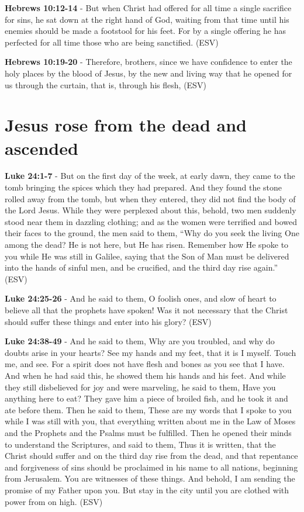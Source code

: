 \documentclass[11pt]{article}
\begin{document}
\textbf{Hebrews 10:12-14} - But when Christ had offered for all time a single sacrifice for sins, he sat down at the right hand of God, waiting from that time until his enemies should be made a footstool for his feet. For by a single offering he has perfected for all time those who are being sanctified. (ESV)

\textbf{Hebrews 10:19-20} - Therefore, brothers, since we have confidence to enter the holy places by the blood of Jesus, by the new and living way that he opened for us through the curtain, that is, through his flesh, (ESV)

\section{Jesus rose from the dead and ascended}
\label{sec:orgf3ffcc9}
\textbf{Luke 24:1-7} - But on the first day of the week, at early dawn, they came to the tomb bringing the spices which they had prepared. And they found the stone rolled away from the tomb, but when they entered, they did not find the body of the Lord Jesus. While they were perplexed about this, behold, two men suddenly stood near them in dazzling clothing; and as the women were terrified and bowed their faces to the ground, the men said to them, “Why do you seek the living One among the dead? He is not here, but He has risen. Remember how He spoke to you while He was still in Galilee, saying that the Son of Man must be delivered into the hands of sinful men, and be crucified, and the third day rise again.” (ESV)

\textbf{Luke 24:25-26} - And he said to them, O foolish ones, and slow of heart to believe all that the prophets have spoken! Was it not necessary that the Christ should suffer these things and enter into his glory? (ESV)

\textbf{Luke 24:38-49} - And he said to them, Why are you troubled, and why do doubts arise in your hearts? See my hands and my feet, that it is I myself. Touch me, and see. For a spirit does not have flesh and bones as you see that I have. And when he had said this, he showed them his hands and his feet. And while they still disbelieved for joy and were marveling, he said to them, Have you anything here to eat? They gave him a piece of broiled fish, and he took it and ate before them. Then he said to them, These are my words that I spoke to you while I was still with you, that everything written about me in the Law of Moses and the Prophets and the Psalms must be fulfilled. Then he opened their minds to understand the Scriptures, and said to them, Thus it is written, that the Christ should suffer and on the third day rise from the dead, and that repentance and forgiveness of sins should be proclaimed in his name to all nations, beginning from Jerusalem. You are witnesses of these things. And behold, I am sending the promise of my Father upon you. But stay in the city until you are clothed with power from on high. (ESV)
\end{document}
